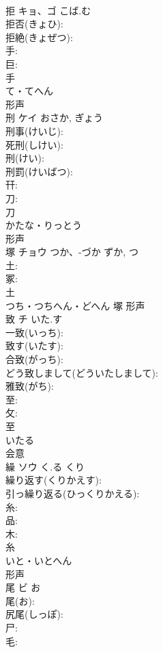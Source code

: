\documentclass[8pt]{extreport}
\begin{document}
\begin{CJK}{UTF8}{min}
\\	拒	キョ、ゴ	こば.む		
\\	拒否(きょひ): 
\\	拒絶(きょぜつ): 
\\	手: 
\\	巨: 
\\	手	
\\	て・てへん	
\\	形声 
\\	刑	ケイ		おさか, ぎょう	
\\	刑事(けいじ): 
\\	死刑(しけい): 
\\	刑(けい): 
\\	刑罰(けいばつ): 
\\	幵: 
\\	刀: 
\\	刀	
\\	かたな・りっとう	
\\	形声 
\\	塚	チョウ	つか、-づか	ずか, つ	
\\	土: 
\\	冢: 
\\	土	
\\	つち・つちへん・どへん	塚	形声 
\\	致	チ	いた.す		
\\	一致(いっち): 
\\	致す(いたす): 
\\	合致(がっち): 
\\	どう致しまして(どういたしまして): 
\\	雅致(がち): 
\\	至: 
\\	攵: 
\\	至	
\\	いたる	
\\	会意 
\\	繰	ソウ	く.る	くり	
\\	繰り返す(くりかえす): 
\\	引っ繰り返る(ひっくりかえる): 
\\	糸: 
\\	品: 
\\	木: 
\\	糸	
\\	いと・いとへん	
\\	形声 
\\	尾	ビ	お		
\\	尾(お): 
\\	尻尾(しっぽ): 
\\	尸: 
\\	毛: 

\end{CJK}
\end{document}

